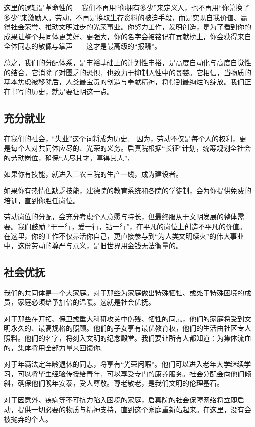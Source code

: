 这里的逻辑是革命性的： 我们不再用``你拥有多少''来定义人，也不再用``你兑换了多少''来激励人。劳动，不再是换取生存资料的被迫手段，而是实现自我价值、赢得社会荣誉、推动文明进步的光荣事业。你努力工作，发明创造，是为了看到你的成果让整个共同体更美好、更强大，你的名字会被铭记在贡献榜上，你会获得来自全体同志的敬佩与掌声------这才是最高级的``报酬''。

总之，我们的分配体系，是丰裕基础上的计划性丰裕，是高度自动化与高度自觉性的结合。它消除了对匮乏的恐惧，也致力于抑制人性中的贪婪。它相信，当物质的基本焦虑被移除后，人类最宝贵的创造与奉献精神，将得到最绚烂的绽放。我们正在书写的历史，就是要证明这一点。

\subsection{充分就业}\label{ux5145ux5206ux5c31ux4e1a}

在我们的社会，``失业''这个词将成为历史。 因为，劳动不仅是每个人的权利，更是每个人对共同体应尽的、光荣的义务。启真院根据``长征''计划，统筹规划全社会的劳动岗位，确保``人尽其才，事得其人''。

如果你有技能，就进入工农三院的生产一线，成为建设者。

如果你有热情但缺乏技能，建德院的教育系统和各院的学徒制，会为你提供免费的培训，直到你胜任岗位。

劳动岗位的分配，会充分考虑个人意愿与特长，但最终服从于文明发展的整体需要。我们鼓励 ``干一行，爱一行，钻一行''，在平凡的岗位上创造不平凡的价值。在这里，你的工作不仅养活你自己，更直接参与到``为人类文明续火''的伟大事业中，这份劳动的尊严与意义，是旧世界用金钱无法衡量的。

\subsection{社会优抚}\label{ux793eux4f1aux4f18ux629a}

我们的共同体是一个大家庭。对于那些为家庭做出特殊牺牲、或处于特殊困境的成员，家庭必须给予加倍的温暖。这就是社会优抚。

对于那些在开拓、保卫或重大科研攻关中伤残、牺牲的同志，他们的家庭将受到文明永久的、最高规格的照顾。他们的子女享有最优教育权，他们的生活由社区专人照料。他们的名字，将刻入文明的纪念殿堂。我们要让所有人都知道：为集体流血的，集体将用全部力量来回馈你。

对于年满法定年龄退休的同志，将享有``光荣闲暇''。他们可以进入老年大学继续学习，可以将毕生经验传授给青年，可以享受专门的康养服务。社会分配会向他们倾斜，确保他们晚年安泰，受人尊敬。尊老敬老，是我们文明的伦理基石。

对于因意外、疾病等不可抗力陷入困境的家庭，启真院的社会保障网络将立即启动，提供一切必要的物质与精神支持，直到这个家庭重新站起来。在这里，没有会被抛弃的个人。
